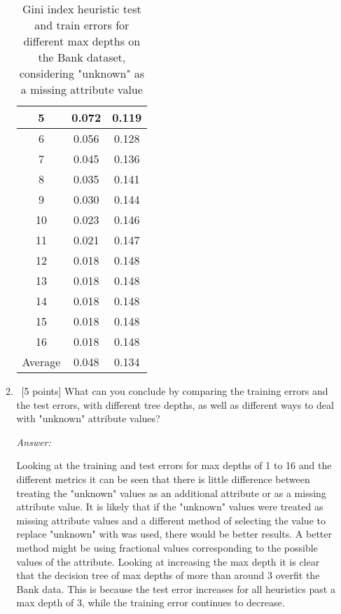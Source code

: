 \documentclass[12pt, fullpage,letterpaper]{article}
\begin{document}
\begin{enumerate}
\begin{enumerate}
\begin{table}[ht]
\begin{tabular}{|c|c|c|}
		5 & 0.072 & 0.119 \\ \hline
		6 & 0.056 & 0.128 \\ \hline
		7 & 0.045 & 0.136 \\ \hline
		8 & 0.035 & 0.141 \\ \hline
		9 & 0.030 & 0.144 \\ \hline
		10 & 0.023 & 0.146 \\ \hline
		11 & 0.021 & 0.147 \\ \hline
		12 & 0.018 & 0.148 \\ \hline
		13 & 0.018 & 0.148 \\ \hline
		14 & 0.018 & 0.148 \\ \hline
		15 & 0.018 & 0.148 \\ \hline
		16 & 0.018 & 0.148 \\ \hline
		Average & 0.048 & 0.134 \\ \hline
	\end{tabular}
	\caption{Gini index heuristic test and train errors for different max depths on the Bank dataset, considering "unknown" as a missing attribute value}
    \label{table:3bginiindex}
\end{table}

	
	\item~[5 points] What can you conclude by comparing the training errors and the test errors, with different tree depths, as well as different ways to deal with "unknown" attribute values?

    \textit{Answer:} 

    Looking at the training and test errors for max depths of 1 to 16 and the different metrics it can be seen that there is little difference between treating the "unknown" values as an additional attribute or as a missing attribute value. 
    It is likely that if the "unknown" values were treated as missing attribute values and a different method of selecting the value to replace "unknown" with was used, there would be better results. 
    A better method might be using fractional values corresponding to the possible values of the attribute.
    Looking at increasing the max depth it is clear that the decision tree of max depths of more than around 3 overfit the Bank data. 
    This is because the test error increases for all heuristics past a max depth of 3, while the training error continues to decrease.


\end{enumerate}
\end{enumerate}
\end{document}
